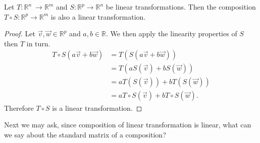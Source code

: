 \begin{theorem}
Let $T:\mathbb{R}^n\ \to \mathbb{R}^m$ and $S:\mathbb{R}^p \to \mathbb{R}^n$ 
be linear transformations. Then the composition 
$T\circ S:\mathbb{R}^p \to \mathbb{R}^m$ is also a linear transformation.
\end{theorem}

\begin{proof}
Let $\vec{v},\vec{w} \in \mathbb{R}^p$ and $a,b \in \mathbb{R}$. 
We then apply the linearity properties of $S$ then $T$ in turn.
\begin{align*}
T\circ S(a\vec{v}+b\vec{w})&=T(S(a\vec{v}+b\vec{w}))\\
&=T(aS(\vec{v})+bS(\vec{w}))\\
&=aT(S(\vec{v}))+bT(S(\vec{w}))\\
&=aT\circ S(\vec{v})+bT\circ S(\vec{w}).
\end{align*}
Therefore $T\circ S$ is a linear transformation.
\end{proof}
Next we may ask, since composition of linear transformation is linear, what
can we say about the standard matrix of a composition?

